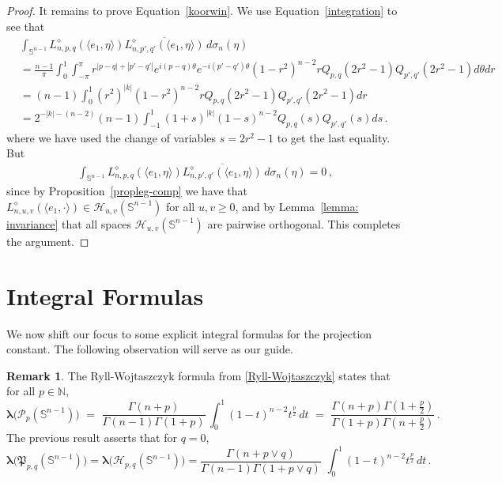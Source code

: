 \documentclass[12pt]{amsart}
\numberwithin{subsection}{section}
\theoremstyle{definition}
\newtheorem{remark}[theorem]{Remark}
\theoremstyle{remark}
\begin{document}
\begin{proof}
It remains to prove Equation~\eqref{koorwin}. We use Equation~\eqref{integration} to see that
  \begin{align*}
    &
  \int_{\mathbb{S}^{n-1}}
    L_{n,p,q}^{\diamond} (\langle e_1, \eta \rangle)  \overline{
L_{n,p',q'}^{\diamond}(\langle e_1, \eta \rangle)}
    \,d\sigma_n(\eta)
    \\&
  =
  \frac{n-1}{\pi}\int_{0}^{1} \int_{-\pi}^{\pi}
    r^{|p-q|+|p'-q'|}  e^{i (p-q)\theta} e^{-i (p'-q')\theta} (1-r^2)^{n-2} r
    Q_{p,q} (2r^2 -1)  Q_{p',q'} (2r^2 -1)
  d\theta dr
  \\&
  =
  (n-1)\int_{0}^{1}
    (r^2)^{|k|}  (1-r^2)^{n-2} r
    Q_{p,q} (2r^2 -1)  Q_{p',q'} (2r^2 -1)
  dr
  \\&
  =
  2^{-|k|-(n-2)} (n-1)  \int_{-1}^{1} (1+s)^{|k|} (1-s)^{n-2} Q_{p,q}(s) Q_{p',q'} (s) ds\,.
    \end{align*}
where we have used the change of variables  $s=2r^2-1 $ to get the last equality.
    But
      \begin{align*}
      \int_{\mathbb{S}^{n-1}}
    L_{n,p,q}^{\diamond} (\langle e_1, \eta \rangle)  \overline{
L_{n,p',q'}^{\diamond} (\langle e_1, \eta \rangle)}
    \,d\sigma_n(\eta) = 0\,,
    \end{align*}
  since by Proposition~\ref{propleg-comp} we have that
   $L_{n,u,v}^{\diamond} (\langle e_1, \cdot \rangle) \in \mathcal{H}_{u,v}(\mathbb{S}^{n-1})  $ for all  $u,v \geq 0 $, and by Lemma~\ref{lemma: invariance}  that all spaces
   $\mathcal{H}_{u,v}(\mathbb{S}^{n-1})  $ are pairwise orthogonal. This  completes the argument.    \end{proof}

\section{Integral Formulas}


We now shift our focus to some explicit integral formulas for the projection constant. The following observation will serve as our guide.


\begin{remark} \label{RW}
The   Ryll-Wojtaszczyk formula from \eqref{Ryll-Wojtaszczyk} states that for all  $p \in \mathbb{N}, $
\begin{equation*}
  \boldsymbol{\lambda}\big(\mathcal{P}_{p}(\mathbb{S}^{n-1})\big)
 \,\,=\,\,  \frac{\Gamma(n + p )}{\Gamma(n-1)\Gamma( 1 + p )}\,
  \int_0^1 (1 - t)^{n-2} t^{\frac{p}{2}}\,dt  \,\,=\,\,
\frac{\Gamma(n+p) \Gamma(1 + \frac{p}{2})}{\Gamma(1 + p) \Gamma(n + \frac{p}{2})} \,.
\end{equation*}
The previous result asserts that for $q=0$,
\begin{equation*} \label{RN}
 \boldsymbol{\lambda}\big(\mathfrak{P}_{p,q}(\mathbb{S}^{n-1})\big) =\boldsymbol{\lambda}\big(\mathcal{H}_{p,q}(\mathbb{S}^{n-1})\big)
= \frac{\Gamma(n + p \vee q )}{\Gamma(n-1)\Gamma( 1 + p \vee q )}\,\,  \int_0^1 (1 - t)^{n-2} t^{\frac{p}{2}}\,dt\,.
\end{equation*}
  \end{remark}
\end{document}
